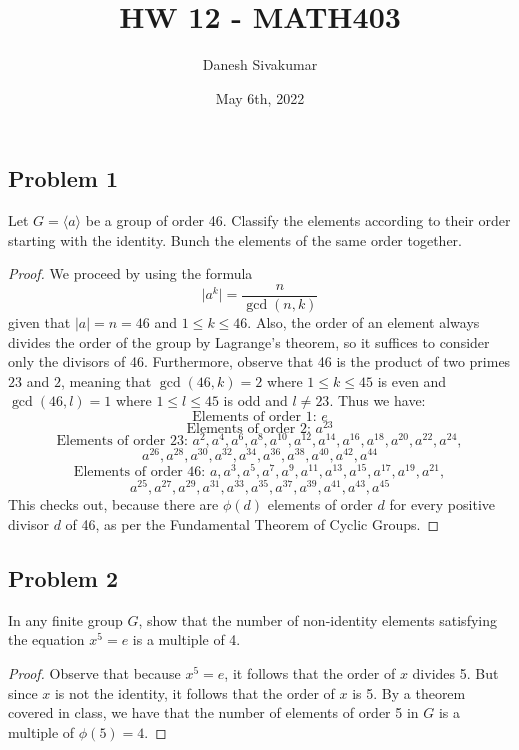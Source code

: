 \documentclass{article}
\title{HW 12 - MATH403}
\author{Danesh Sivakumar}
\date{May 6th, 2022}
\begin{document}
\maketitle 

\subsection*{Problem 1}
Let $G = \langle a \rangle$ be a group of order 46. Classify the elements according
to their order starting with the identity. Bunch the elements of the same order 
together.
\begin{proof}
	We proceed by using the formula 
	\[ \big|a^k\big| = \frac{n}{\gcd{(n, k)}}\]
	given that $|a| = n = 46$ and $1 \leq k \leq 46$. Also, the order of an element
	always divides the order of the group by Lagrange's theorem, so it suffices to 
	consider only the divisors of 46. Furthermore, observe that 46 is the product of
	two primes $23$ and $2$, meaning that $\gcd{(46, k)} = 2$ where 
	$1 \leq k \leq 45$ is even and $\gcd{(46, l)} = 1$ where $1 \leq l \leq 45$ is 
	odd and $l \neq 23$. Thus we have:
	\[ \text{Elements of order 1: } e\]
	\[ \text{Elements of order 2: } a^{23}\]
	\[ \text{Elements of order 23: } a^{2}, a^{4}, a^{6}, a^{8}, a^{10}, a^{12}, a^{
	14}, a^{16}, a^{18}, a^{20}, a^{22}, a^{24}, \]
	\[ a^{26}, a^{28}, a^{30}, a^{32}, a^{34}, a^{36}, a^{38}, a^{40}, a^{42},
	a^{44}\]
	\[ \text{Elements of order 46: } a, a^{3}, a^{5}, a^{7}, a^{9}, a^{11}, a^{
	13}, a^{15}, a^{17}, a^{19}, a^{21}, \]
	\[ a^{25}, a^{27}, a^{29}, a^{31}, a^{33}, a^{35}, a^{37}, a^{39}, a^{41},
	a^{43}, a^{45}\]
	This checks out, because there are $\phi(d)$ elements of order $d$ for every
	positive divisor $d$ of 46, as per the Fundamental Theorem of Cyclic Groups.
\end{proof}

\subsection*{Problem 2}
In any finite group $G$, show that the number of non-identity elements satisfying
the equation $x^5 = e$ is a multiple of 4.
\begin{proof}

	Observe that because $x^5 = e$, it follows that the order of $x$ divides 5. But
	since $x$ is not the identity, it follows that the order of $x$ is 5. By a
	theorem covered in class, we have that the number of elements of order 5 in $G$
	is a multiple of $\phi(5) = 4$. 
	

\end{proof}
\end{document}
